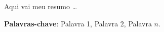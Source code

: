 Aqui vai meu resumo \ldots

\vspace{1.5ex}

{\bf Palavras-chave}: Palavra 1, Palavra 2, Palavra $n$.
